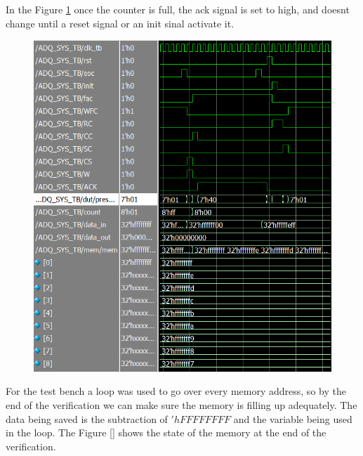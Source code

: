 \documentclass[conference]{IEEEtran}
\begin{document}
	In the Figure \ref{fig:counter-reset-ack} once the counter is full, the ack signal is set to high, and doesnt change until a reset signal or an init sinal activate it.
	
	\begin{figure}[H]
		\centering
		\includegraphics[width=\columnwidth]{"Files/counter reset ack"}
		\caption{}
		\label{fig:counter-reset-ack}
	\end{figure}
	
	
	For the test bench a loop was used to go over every memory address, so by the end of the verification we can make sure the memory is filling up adequately. The data being saved is the subtraction of $'hFFFFFFFF$ and the variable being used in the loop.
	The Figure \ref{} shows the state of the memory at the end of the verification. 
	
\end{document}
